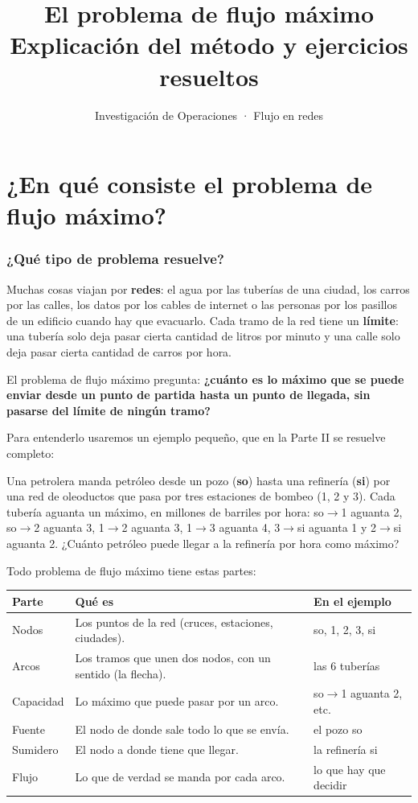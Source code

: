 \documentclass[11pt,a4paper]{article}
\title{\textbf{El problema de flujo máximo}\\[4pt]\large Explicación del método y ejercicios resueltos}
\author{Investigación de Operaciones · Flujo en redes}
\date{}
\begin{document}
\maketitle
\tableofcontents
\newpage

\part{¿En qué consiste el problema de flujo máximo?}

\section{¿Qué tipo de problema resuelve?}

Muchas cosas viajan por \textbf{redes}: el agua por las tuberías de una ciudad, los carros por las calles, los
datos por los cables de internet o las personas por los pasillos de un edificio cuando hay que evacuarlo. Cada
tramo de la red tiene un \textbf{límite}: una tubería solo deja pasar cierta cantidad de litros por minuto y una
calle solo deja pasar cierta cantidad de carros por hora.

El problema de flujo máximo pregunta: \textbf{¿cuánto es lo máximo que se puede enviar desde un punto de partida
hasta un punto de llegada, sin pasarse del límite de ningún tramo?}

Para entenderlo usaremos un ejemplo pequeño, que en la Parte II se resuelve completo:

\begin{ojo}
Una petrolera manda petróleo desde un pozo (\textbf{so}) hasta una refinería (\textbf{si}) por una red de
oleoductos que pasa por tres estaciones de bombeo (1, 2 y 3). Cada tubería aguanta un máximo, en millones de
barriles por hora: so$\to$1 aguanta 2, so$\to$2 aguanta 3, 1$\to$2 aguanta 3, 1$\to$3 aguanta 4,
3$\to$si aguanta 1 y 2$\to$si aguanta 2. ¿Cuánto petróleo puede llegar a la refinería por hora como máximo?
\end{ojo}

Todo problema de flujo máximo tiene estas partes:

\begin{center}\small
\begin{tabular}{p{3.0cm}p{6.6cm}p{4.6cm}}
\toprule
\textbf{Parte} & \textbf{Qué es} & \textbf{En el ejemplo} \\
\midrule
Nodos & Los puntos de la red (cruces, estaciones, ciudades). & so, 1, 2, 3, si \\
Arcos & Los tramos que unen dos nodos, con un sentido (la flecha). & las 6 tuberías \\
Capacidad & Lo máximo que puede pasar por un arco. & so$\to$1 aguanta 2, etc. \\
Fuente & El nodo de donde sale todo lo que se envía. & el pozo so \\
Sumidero & El nodo a donde tiene que llegar. & la refinería si \\
Flujo & Lo que de verdad se manda por cada arco. & lo que hay que decidir \\
\bottomrule
\end{tabular}
\end{center}
\end{document}
